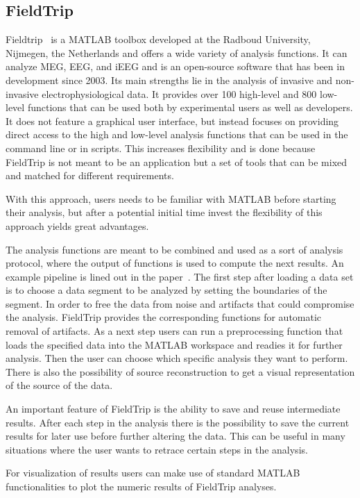 \subsection{FieldTrip}
Fieldtrip~\cite{fieldtrip} is a MATLAB toolbox developed at the Radboud University,  Nijmegen,  the Netherlands and offers a wide variety of analysis functions.  It can analyze MEG, EEG, and iEEG and is an open-source software that has been in development since 2003. Its main strengths lie in the analysis of invasive and non-invasive electrophysiological data. It provides over 100 high-level and 800 low-level functions that can be used both by experimental users as well as developers. It does not feature a graphical user interface, but instead focuses on providing direct access to the high and low-level analysis functions that can be used in the command line or in scripts.  This increases flexibility and is done because FieldTrip is not meant to be an application but a set of tools that can be mixed and matched for different requirements.

With this approach, users needs to be familiar with MATLAB before starting their analysis, but after a potential initial time invest the flexibility of this approach yields great advantages.

The analysis functions are meant to be combined and used as a sort of analysis protocol, where the output of functions is used to compute the next results. 
An example pipeline is lined out in the paper~\cite{fieldtrip}. The first step after loading a data set is to choose a data segment to be analyzed by setting the boundaries of the segment. In order to free the data from noise and artifacts that could compromise the analysis. FieldTrip provides the corresponding functions for automatic removal of artifacts. As a next step users can run a preprocessing function that loads the specified data into the MATLAB workspace and readies it for further analysis. Then the user can choose which specific analysis they want to perform. There is also the possibility of source reconstruction to get a visual representation of the source of the data.

An important feature of FieldTrip is the ability to save and reuse intermediate results. After each step in the analysis there is the possibility to save the current results for later use before further altering the data. This can be useful in many situations where the user wants to retrace certain steps in the analysis.

For visualization of results users can make use of standard MATLAB functionalities to plot the numeric results of FieldTrip analyses.

